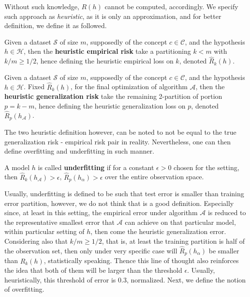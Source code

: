 \documentclass[
  journal=largetwo,
  year=2025,
  volume=37,
]{cup-journal}
\begin{document}
Without such knowledge, $R(h)$ cannot be computed, accordingly. We specify such approach as \textit{heuristic}, as it is only an approximation, and for better definition, we define it as followed. 

\begin{definition}
  Given a dataset $\mathcal{S}$ of size $m$, supposedly of the concept $c\in \mathcal{C}$, and the hypothesis $h\in \mathcal{H}$, then the \textbf{heuristic empirical risk} take a partitioning $k<m$ with $k/m\geq 1/2$, hence defining the heuristic empirical loss on $k$, denoted $\hat{R}_{k}(h)$. 
\end{definition}

\begin{definition}
  Given a dataset $\mathcal{S}$ of size $m$, supposedly of the concept $c\in \mathcal{C}$, and the hypothesis $h\in \mathcal{H}$. Fixed $\hat{R}_{k}(h)$, for the final optimization of algorithm $\mathcal{A}$, then the \textbf{heuristic generalization risk} take the remaining 2-partition of portion $p=k-m$, hence defining the heuristic generalization loss on $p$, denoted $\hat{R}_{p}(h_{\mathcal{A}})$. 
\end{definition}
The two heuristic definition however, can be noted to not be equal to the true generalization risk - empirical risk pair in reality. Nevertheless, one can then define overfitting and underfitting in such manner. 
\begin{definition}[Underfitting]
  A model $h$ is called \textbf{underfitting} if for a constant $\epsilon > 0$ chosen for the setting, then $\hat{R}_{k}(h_{\mathcal{A}})>\epsilon$, $\hat{R}_{p}(h_{\alpha})> \epsilon$ over the entire observation space. 
\end{definition}
Usually, underfitting is defined to be such that test error is smaller than training error partition, however, we do not think that is a good definition. Especially since, at least in this setting, the empirical error under algorithm $\mathcal{A}$ is reduced to the representative smallest error that $\mathcal{A}$ can achieve on that particular model, within particular setting of $h$, then come the heuristic generalization error. Considering also that $k/m\geq 1/2$, that is, at least the training partition is half of the observation set, then only under very specific case will $\hat{R}_{p}(h_{\alpha})$ be smaller than $\hat{R}_{k}(h)$, statistically speaking. Thence this line of thought also reinforces the idea that both of them will be larger than the threshold $\epsilon$. Usually, heuristically, this threshold of error is $0.3$, normalized. Next, we define the notion of overfitting. 
\end{document}
